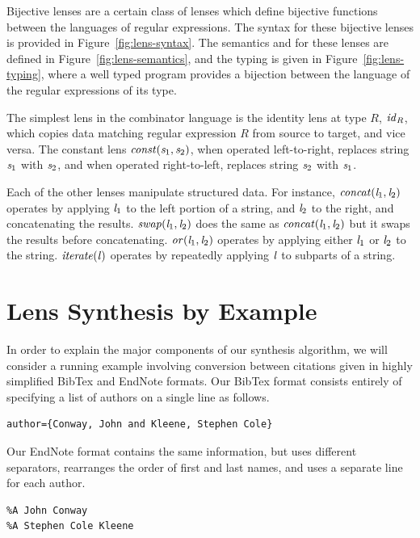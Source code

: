 \documentclass[numbers]{sigplanconf}
\begin{document}
Bijective lenses are a certain class of lenses which define bijective functions
between the languages of regular expressions.
The syntax for these bijective lenses is provided in Figure~\ref{fig:lens-syntax}.
The semantics and for these lenses are defined in Figure~\ref{fig:lens-semantics},
and the typing is given in Figure~\ref{fig:lens-typing}, where a well
typed program provides a bijection between the language of the regular expressions
of its type.

The simplest lens in the combinator language is the identity lens 
at type $R$,
$\mathit{id}_{R}$, which copies data matching regular expression $R$
from source to target, and vice versa.  The
constant lens $\mathit{const}(\mathit{s}_1,\mathit{s}_2)$, when operated left-to-right, 
replaces string $\mathit{s}_1$ with $\mathit{s}_2$, and when operated right-to-left,
replaces string $\mathit{s}_2$ with $\mathit{s}_1$.

Each of the other lenses manipulate structured data.  For instance,
$\mathit{concat}(\mathit{l}_1,\mathit{l}_2)$ operates by applying $\mathit{l}_1$ to the left
portion of a string, and $\mathit{l}_2$ to the right, and concatenating the results.
$\mathit{swap}(\mathit{l}_1,\mathit{l}_2)$ does the same as $\mathit{concat}(\mathit{l}_1,\mathit{l}_2)$
but it swaps the results before concatenating.
$\mathit{or}(\mathit{l}_1,\mathit{l}_2)$ operates by applying either $\mathit{l}_1$ or $\mathit{l}_2$
to the string.  $\mathit{iterate(\mathit{l})}$ operates by repeatedly applying $\mathit{l}$
to subparts of a string.

\section{Lens Synthesis by Example}

In order to explain the major components of our synthesis algorithm,
we will consider a running example involving conversion between citations given
in highly simplified BibTex and EndNote formats.  Our BibTex format
consists entirely of specifying a list of authors on a single line as follows.
\begin{lstlisting}
author={Conway, John and Kleene, Stephen Cole}
\end{lstlisting}
Our EndNote format contains the same information, but uses different separators,
rearranges the order of first and last names, and uses a separate line for each
author. 
\begin{lstlisting}
%A John Conway
%A Stephen Cole Kleene
\end{lstlisting}
\end{document}
